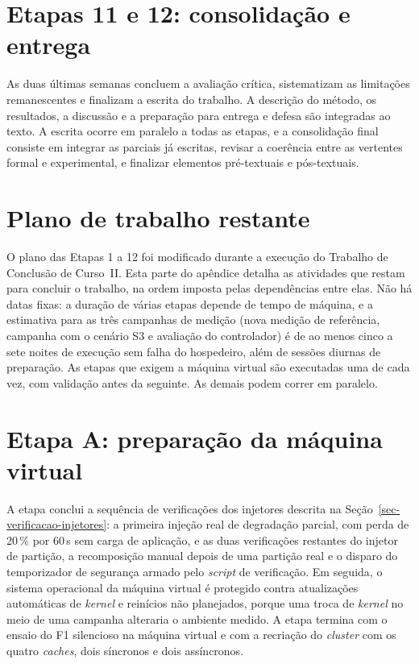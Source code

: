 \section*{Etapas 11 e 12: consolidação e entrega}
\label{ap-tcc2-etapa11}

As duas últimas semanas concluem a avaliação crítica, sistematizam as limitações remanescentes e finalizam a escrita do trabalho. A descrição do método, os resultados, a discussão e a preparação para entrega e defesa são integradas ao texto. A escrita ocorre em paralelo a todas as etapas, e a consolidação final consiste em integrar as parciais já escritas, revisar a coerência entre as vertentes formal e experimental, e finalizar elementos pré-textuais e pós-textuais.


\section*{Plano de trabalho restante}

O plano das Etapas 1 a 12 foi modificado durante a execução do Trabalho de Conclusão de Curso~II. Esta parte do apêndice detalha as atividades que restam para concluir o trabalho, na ordem imposta pelas dependências entre elas. Não há datas fixas: a duração de várias etapas depende de tempo de máquina, e a estimativa para as três campanhas de medição (nova medição de referência, campanha com o cenário S3 e avaliação do controlador) é de ao menos cinco a sete noites de execução sem falha do hospedeiro, além de sessões diurnas de preparação. As etapas que exigem a máquina virtual são executadas uma de cada vez, com validação antes da seguinte. As demais podem correr em paralelo.

\section*{Etapa A: preparação da máquina virtual}
\label{ap-tcc2-etapa-a}

A etapa conclui a sequência de verificações dos injetores descrita na Seção~\ref{sec-verificacao-injetores}: a primeira injeção real de degradação parcial, com perda de 20\,\% por 60\,s sem carga de aplicação, e as duas verificações restantes do injetor de partição, a recomposição manual depois de uma partição real e o disparo do temporizador de segurança armado pelo \emph{script} de verificação. Em seguida, o sistema operacional da máquina virtual é protegido contra atualizações automáticas de \emph{kernel} e reinícios não planejados, porque uma troca de \emph{kernel} no meio de uma campanha alteraria o ambiente medido. A etapa termina com o ensaio do F1 silencioso na máquina virtual e com a recriação do \emph{cluster} com os quatro \emph{caches}, dois síncronos e dois assíncronos.

